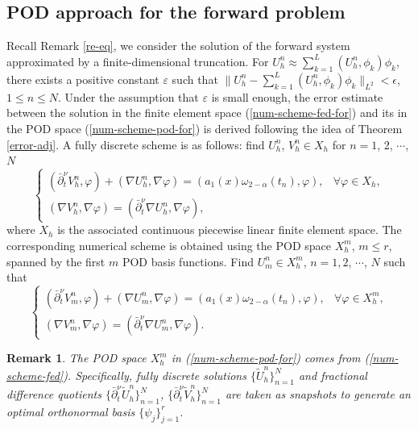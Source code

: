 \documentclass[11pt]{article}
\newtheorem{remark}{Remark}[section]
\numberwithin{equation}{section}
\begin{document}
\subsection{POD approach for the forward problem}
Recall Remark \ref{re-eq}, we consider the solution of the forward system approximated by a finite-dimensional truncation. For $U_h^n \approx\sum_{k=1}^L(U_h^n,\phi_k)\phi_k$, there exists a positive constant $\varepsilon$ such that $\|U_h^n-\sum_{k=1}^L(U_h^n,\phi_k)\phi_k\|_{L^2}<\epsilon$, $1\le n \le N$. Under the assumption that $\varepsilon$ is small enough, the error estimate between the solution in the finite element space (\ref{num-scheme-fed-for}) and its in the POD space (\ref{num-scheme-pod-for}) is derived following the idea of Theorem \ref{error-adj}. 
A fully discrete scheme is as follows: find $U_h^n$, $V_h^n\in X_h$ for $n=1$, 2, $\cdots$, $N$
\begin{equation}\label{num-scheme-fed-for}
\begin{cases}
  (\bar\partial_t^\nu V_h^n,\varphi) + (\nabla U_h^n,\nabla \varphi) = (a_1(x)\omega_{2-\alpha}(t_n),\varphi), & \forall \varphi\in X_h, \\
  (\nabla V_h^n,\nabla\varphi)  = (\bar\partial_t^\nu \nabla U_h^n,\nabla\varphi),
\end{cases}
\end{equation}
where $X_h$ is the associated continuous piecewise linear finite element space. 
The corresponding numerical scheme is obtained using the POD space $X_h^m$, $m\le r$, spanned by the first $m$ POD basis functions. Find $U_m^n\in X_h^m$, $n=1,2$, $\cdots$, $N$ such that
\begin{equation}\label{num-scheme-pod-for}
\begin{cases}
  (\bar\partial_t^\nu V_m^n,\varphi) + (\nabla U_m^n,\nabla \varphi) = (a_1(x)\omega_{2-\alpha}(t_n),\varphi), & \forall \varphi\in X_h^m, \\
  (\nabla V_m^n,\nabla\varphi)  = (\bar\partial_t^\nu \nabla U_m^n,\nabla\varphi).
\end{cases}
\end{equation}

\begin{remark}
The POD space $X_h^m$ in (\ref{num-scheme-pod-for}) comes from (\ref{num-scheme-fed}).  Specifically, fully discrete solutions $\{\widetilde{U}_h^n\}_{n=1}^N$ and fractional difference quotients $\{\bar\partial_t^\nu \widetilde{U}_h^n\}_{n=1}^N$, $\{\bar\partial_t^\nu \widetilde{V}_h^n\}_{n=1}^N$ are taken as snapshots to generate an optimal orthonormal basis $\{\psi_j\}_{j=1}^r$.
\end{remark}
\end{document}
